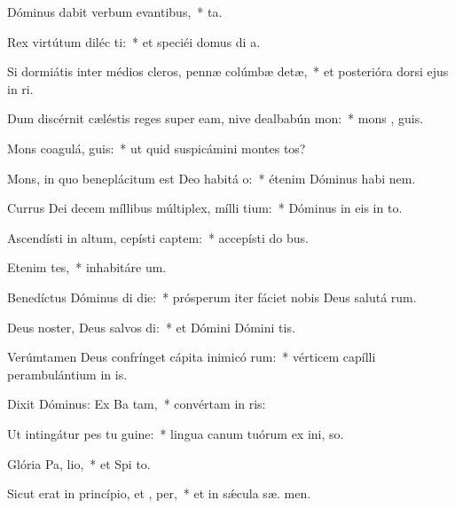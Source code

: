 \item Dóminus dabit verbum evantibus,~*  ta.
\item Rex virtútum diléc ti:~* et speciéi domus di a.
\item Si dormiátis inter médios cleros, pennæ colúmbæ detæ,~* et posterióra dorsi ejus in  ri.
\item Dum discérnit cæléstis reges super eam, nive dealbabún  mon:~* mons ,  guis.
\item Mons coagulá,  guis:~* ut quid suspicámini montes tos?
\item Mons, in quo beneplácitum est Deo habitá  o:~* étenim Dóminus habi  nem.
\item Currus Dei decem míllibus múltiplex, mílli tium:~* Dóminus in eis in   to.
\item Ascendísti in altum, cepísti captem:~* accepísti do  bus.
\item Etenim  tes,~* inhabitáre  um.
\item Benedíctus Dóminus di die:~* prósperum iter fáciet nobis Deus salutá rum.
\item Deus noster, Deus salvos di:~* et Dómini Dómini  tis.
\item Verúmtamen Deus confrínget cápita inimicó rum:~* vérticem capílli perambulántium in  is.
\item Dixit Dóminus: Ex Ba tam,~* convértam in  ris:
\item Ut intingátur pes tu  guine:~* lingua canum tuórum ex ini,  so.
\item Glória Pa,  lio,~* et Spi to.
\item Sicut erat in princípio, et ,  per,~* et in sǽcula sæ. men.
